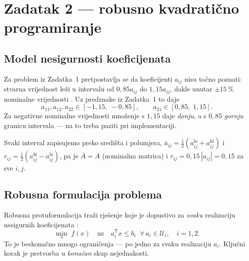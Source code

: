 
\section{Zadatak 2 --- robusno kvadratično programiranje}
\label{sec:zad2}

\subsection{Model nesigurnosti koeficijenata}
\label{sec:zad2:nesigurnost}

Za problem iz Zadatka~1 pretpostavlja se da koeficijenti $a_{ij}$ nisu točno
poznati: stvarna vrijednost leži u intervalu od $0{,}85a_{ij}$ do $1{,}15a_{ij}$,
dakle unutar $\pm 15\,\%$ nominalne vrijednosti \cite[str.~1]{jokic_zadatak}.
Uz predznake iz Zadatka~1 to daje
\begin{equation}
  a_{11}, a_{12}, a_{22} \in [-1{,}15,\; -0{,}85], \qquad
  a_{21} \in [0{,}85,\; 1{,}15].
\end{equation}
Za negativne nominalne vrijednosti množenje s $1{,}15$ daje \emph{donju}, a s
$0{,}85$ \emph{gornju} granicu intervala --- na to treba paziti pri implementaciji.

Svaki interval zapisujemo preko središta i polumjera,
$\bar a_{ij} = \tfrac12(a_{ij}^{\text{lo}} + a_{ij}^{\text{hi}})$ i
$r_{ij} = \tfrac12(a_{ij}^{\text{hi}} - a_{ij}^{\text{lo}})$, pa je
$\bar A = A$ (nominalna matrica) i $r_{ij} = 0{,}15\,|a_{ij}| = 0{,}15$ za sve $i,j$.

\subsection{Robusna formulacija problema}
\label{sec:zad2:formulacija}

Robusna protuformulacija traži rješenje koje je dopustivo za \emph{svaku}
realizaciju nesigurnih koeficijenata \cite[str.~1]{jokic_robusno}:
\begin{equation}
  \min_x\; f(x) \quad \text{uz} \quad a_i^{\mathsf T}x \le b_i
  \;\; \forall\, a_i \in \mathcal{U}_i, \quad i = 1,2 .
  \label{eq:robgen}
\end{equation}
To je beskonačno mnogo ograničenja --- po jedno za svaku realizaciju $a_i$.
Ključni korak je pretvorba u \emph{konačan} skup nejednakosti.

